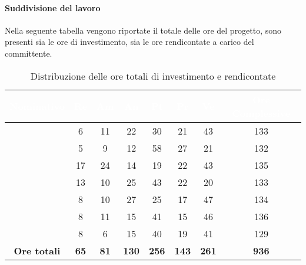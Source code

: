 \paragraph{Suddivisione del lavoro}
Nella seguente tabella vengono riportate il totale delle ore del progetto, sono presenti sia le ore di investimento, sia le ore rendicontate a carico del committente.
\begin{table}[H]
	\begin{center}
		\begin{tabular}{ c c c c c c c c }
		\rowcolor{darkblue} 
		\textcolor{white}{\textbf{Nominativo}} & \textcolor{white}{\textbf{Re}} & \textcolor{white}{\textbf{Am}} & \textcolor{white}{\textbf{An}} & \textcolor{white}{\textbf{Pt}} & \textcolor{white}{\textbf{Pr}} & \textcolor{white}{\textbf{Ve}} & \textcolor{white}{\textbf{Ore Complessive}} \\ \hline
		\BL & 6  & 11  & 22 & 30 & 21 & 43 & 133 \\ \hline
		\FF & 5  & 9  & 12 & 58 & 27 & 21 & 132 \\ \hline
		\MM & 17  & 24  & 14 & 19 & 22 & 43  & 135 \\ \hline
		\PC & 13 & 10  & 25 & 43 & 22 & 20 & 133 \\ \hline
		\TG & 8  & 10 & 27 & 25 & 17 & 47 & 134 \\ \hline
		\TL & 8  & 11 & 15 & 41 & 15 & 46 & 136 \\ \hline
		\VD & 8  & 6  & 15 & 40 & 19 & 41  & 129 \\ \hline
		\textbf{Ore totali} & \textbf{65} & \textbf{81} & \textbf{130} & \textbf{256} & \textbf{143} & \textbf{261} & \textbf{936} \\ \hline
		\end{tabular}
	\caption{Distribuzione delle ore totali di investimento e rendicontate}
	\end{center}
\end{table}
